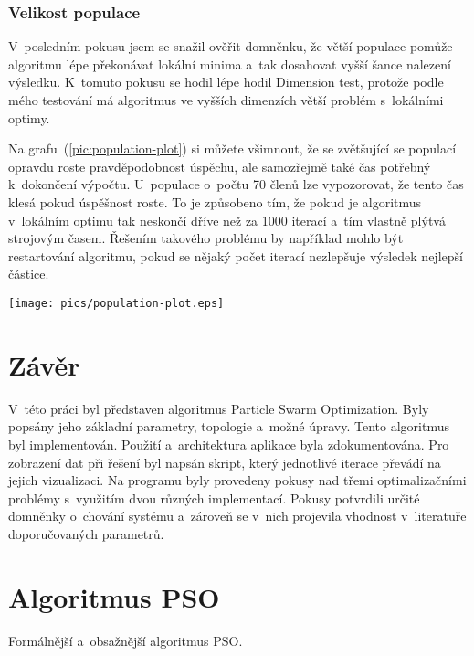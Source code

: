 \documentclass[12pt,a4paper,fleqn]{article}
\begin{document}
\subsubsection*{Velikost populace}
V~posledním pokusu jsem se snažil ověřit domněnku, že větší populace pomůže algoritmu lépe překonávat lokální minima a~tak dosahovat vyšší šance nalezení výsledku. K~tomuto pokusu se hodil lépe hodil Dimension test, protože podle mého testování má algoritmus ve vyšších dimenzích větší problém s~lokálními optimy.

Na grafu~(\ref{pic:population-plot}) si můžete všimnout, že se zvětšující se populací opravdu roste pravděpodobnost úspěchu, ale samozřejmě také čas potřebný k~dokončení výpočtu. U~populace o~počtu 70 členů lze vypozorovat, že tento čas klesá pokud úspěšnost roste. To je způsobeno tím, že pokud je algoritmus v~lokálním optimu tak neskončí dříve než za 1000 iterací a~tím vlastně plýtvá strojovým časem. Řešením takového problému by například mohlo být restartování algoritmu, pokud se nějaký počet iterací nezlepšuje výsledek nejlepší částice.
\begin{figure*}[h!]
\centering
\texttt{[image: pics/population-plot.eps]}
\caption{Závislost úspěchu vyhledávání a~času na velikosti populace}
\label{pic:population-plot}
\end{figure*}

\newpage
\section{Závěr} \label{zaver}
V~této práci byl představen algoritmus Particle Swarm Optimization. Byly popsány jeho základní parametry, topologie a~možné úpravy. Tento algoritmus byl implementován. Použití a~architektura aplikace byla zdokumentována. Pro zobrazení dat při řešení byl napsán skript, který jednotlivé iterace převádí na jejich vizualizaci. Na programu byly provedeny pokusy nad třemi optimalizačními problémy s~využitím dvou různých implementací. Pokusy potvrdili určité domněnky o~chování systému a~zároveň se v~nich projevila vhodnost v~literatuře doporučovaných parametrů.


  \begin{flushleft}
  \end{flushleft}

\newpage
\appendix
\section{Algoritmus PSO} \label{app_algoritmus_pso}
Formálnější a~obsažnější algoritmus PSO.
\end{document}
